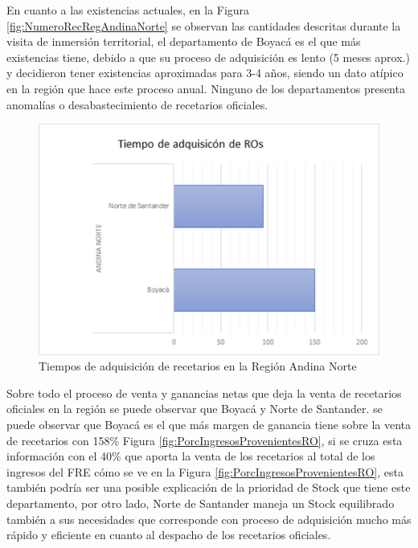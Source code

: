 \documentclass[
]{book}
\begin{document}
En cuanto a las existencias actuales, en la Figura \ref{fig:NumeroRecRegAndinaNorte} se observan las cantidades descritas durante la visita de inmersión territorial, el departamento de Boyacá es el que más existencias tiene, debido a que su proceso de adquisición es lento (5 meses aprox.) y decidieron tener existencias aproximadas para 3-4 años, siendo un dato atípico en la región que hace este proceso anual. Ninguno de los departamentos presenta anomalías o desabastecimiento de recetarios oficiales.

\begin{figure}
\includegraphics[width=0.85\linewidth]{figures/Imagen2} \caption{Tiempos de adquisición de recetarios en la Región Andina Norte}\label{fig:TiemposAdqRecRegAndinaNorte}
\end{figure}

Sobre todo el proceso de venta y ganancias netas que deja la venta de recetarios oficiales en la región se puede observar que Boyacá y Norte de Santander. se puede observar que Boyacá es el que más margen de ganancia tiene sobre la venta de recetarios con 158\% Figura \ref{fig:PorcIngresosProvenientesRO}, si se cruza esta información con el 40\% que aporta la venta de los recetarios al total de los ingresos del FRE cómo se ve en la Figura \ref{fig:PorcIngresosProvenientesRO}, esta también podría ser una posible explicación de la prioridad de Stock que tiene este departamento, por otro lado, Norte de Santander maneja un Stock equilibrado también a sus necesidades que corresponde con proceso de adquisición mucho más rápido y eficiente en cuanto al despacho de los recetarios oficiales.
\end{document}
